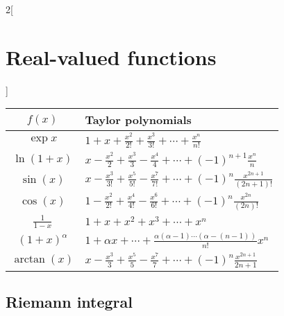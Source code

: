 \documentclass[../../../main.tex]{subfiles}
\begin{document}
\begin{multicols}{2}[\section{Real-valued functions}]
\begin{center}
        \renewcommand*{\arraystretch}{2}
        \begin{tabular}{|c|>{\centering\arraybackslash}m{6.5cm}|}
            \hline
            $f(x)$                       & Taylor polynomials                                                                                     \\
            \hline
            $\exp{x}$                    & $\displaystyle 1+x+\frac{x^2}{2!}+\frac{x^3}{3!}+\cdots+\frac{x^n}{n!}$                                \\
            $\ln (1+x)$                  & $\displaystyle x-\frac{x^2}{2}+\frac{x^3}{3}-\frac{x^4}{4}+\cdots+{(-1)}^{n+1}\frac{x^n}{n}$           \\
            $\sin(x)$                    & $\displaystyle x-\frac{x^3}{3!}+\frac{x^5}{5!}-\frac{x^7}{7!}+\cdots+{(-1)}^n\frac{x^{2n+1}}{(2n+1)!}$ \\
            $\cos(x)$                    & $\displaystyle 1-\frac{x^2}{2!}+\frac{x^4}{4!}-\frac{x^6}{6!}+\cdots+{(-1)}^n\frac{x^{2n}}{(2n)!}$     \\
            $\displaystyle\frac{1}{1-x}$ & $\displaystyle 1+x+x^2+x^3+\cdots+x^n$                                                                 \\
            ${(1+x)}^\alpha$             & $\displaystyle 1+\alpha x+\cdots+\frac{\alpha(\alpha-1)\cdots(\alpha-(n-1))}{n!}x^n$                   \\
            $\arctan(x)$                 & $\displaystyle x-\frac{x^3}{3}+\frac{x^5}{5}-\frac{x^7}{7}+\cdots+{(-1)}^n\frac{x^{2n+1}}{2n+1}$       \\
            \hline
        \end{tabular}
    \end{center}
    \subsection{Riemann integral}

\end{multicols}
\end{document}
